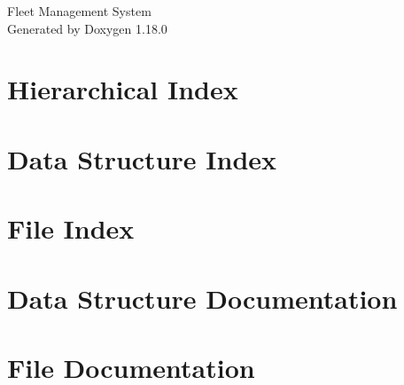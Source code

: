 \documentclass[twoside]{book}
\newcommand{\+}{\discretionary{\mbox{\scriptsize$\hookleftarrow$}}{}{}}
\newcommand{\clearemptydoublepage}{%
    \newpage{\pagestyle{empty}\cleardoublepage}%
  }
\begin{document}
  \raggedbottom
    \hypersetup{pageanchor=false,
                bookmarksnumbered=true,
                pdfencoding=unicode
               }
  \begin{titlepage}
  \vspace*{7cm}
  \begin{center}%
  {\Large Fleet Management System}\\
  \vspace*{1cm}
  {\large Generated by Doxygen 1.18.0}\\
  \end{center}
  \end{titlepage}
  \clearemptydoublepage
  \tableofcontents
  \clearemptydoublepage
  \hypersetup{pageanchor=true}
\chapter{Hierarchical Index}

\chapter{Data Structure Index}

\chapter{File Index}

\chapter{Data Structure Documentation}




\chapter{File Documentation}




  \backmatter
  \newpage
  \clearemptydoublepage
  \printindex
\end{document}
